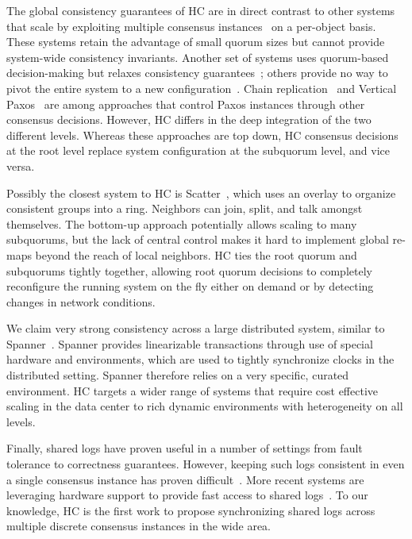 The global consistency guarantees of HC are in direct contrast to other systems that scale by exploiting multiple consensus instances~\cite{bigtable,mdcc,spanner} on a per-object basis.
These systems retain the advantage of small quorum sizes but cannot provide system-wide consistency invariants.
Another set of systems uses quorum-based decision-making but relaxes consistency guarantees~\cite{dynamo,pnuts,cops}; others provide no way to pivot the entire system to a new configuration~\cite{scatter}.
Chain replication~\cite{van2004chain} and Vertical Paxos~\cite{vertical_paxos} are among approaches that control Paxos instances through other consensus decisions.
However, HC differs in the deep integration of the two different levels.
Whereas these approaches are top down, HC consensus decisions at the root level replace system configuration at the subquorum level, and vice versa.

Possibly the closest system to HC is Scatter~\cite{scatter}, which uses an overlay to organize consistent groups into a ring.
Neighbors can join, split, and talk amongst themselves. The bottom-up approach potentially allows scaling to many subquorums, but the lack of central control makes it hard to implement global re-maps beyond the reach of local neighbors.
HC ties the root quorum and subquorums tightly together, allowing root quorum decisions to completely reconfigure the running system on the fly either on demand or by detecting changes in network conditions.

We claim very strong consistency across a large distributed system, similar to Spanner~\cite{spanner}.
Spanner provides linearizable  transactions through use of special hardware and environments, which are used to tightly synchronize clocks in the distributed setting.
Spanner therefore relies on a very specific, curated environment. HC targets a wider range of systems that require cost effective scaling in the data center to rich dynamic environments with heterogeneity on all levels.

Finally, shared logs have proven useful in a number of settings from fault tolerance to correctness guarantees.
However, keeping such logs consistent in even a single consensus instance has proven difficult~\cite{chubby,gfs,zookeeper}.
More recent systems are leveraging hardware support to provide fast access to shared logs~\cite{vcorfu,tango,calvindb,calvinfs,hyder-a,fawn}.
To our knowledge, HC is the first work to propose synchronizing shared logs across multiple discrete consensus instances in the wide area.
